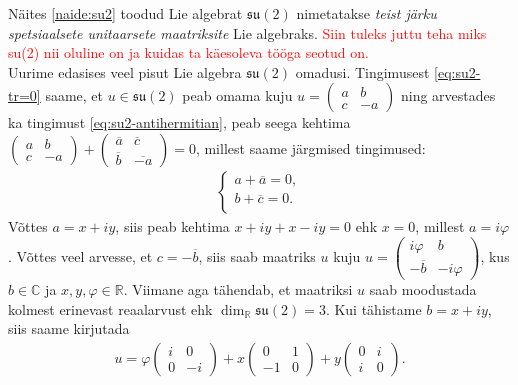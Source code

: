 \documentclass[a4paper,12pt]{article}
\theoremstyle{plain}
\theoremstyle{definition}
\numberwithin{equation}{section}
\begin{document}
Näites \ref{naide:su2} toodud Lie algebrat $\mathfrak{su}\left(2\right)$ nimetatakse \emph{teist järku spetsiaalsete unitaarsete maatriksite} Lie algebraks. \textcolor{red}{Siin tuleks juttu teha miks su(2) nii oluline on ja kuidas ta käesoleva tööga seotud on.} \\
Uurime edasises veel pisut Lie algebra $\mathfrak{su}\left(2\right)$ omadusi. Tingimusest \ref{eq:su2-tr=0} saame, et $u \in \mathfrak{su}\left(2\right)$ peab omama kuju $u = \begin{pmatrix} a & b \\ c & -a\end{pmatrix}$ ning arvestades ka tingimust \ref{eq:su2-antihermitian}, peab seega kehtima $\begin{pmatrix} a & b \\ c & -a\end{pmatrix} + \begin{pmatrix} \overline{a} & \overline{c} \\ \overline{b} & \overline{-a} \end{pmatrix} = 0$, millest saame järgmised tingimused:
\begin{align*}
\begin{cases}
    a + \overline{a} = 0, \\
    b + \overline{c} = 0. \\
  \end{cases}
\end{align*}
Võttes $a = x + iy$, siis peab kehtima $x + iy + x - iy = 0$ ehk $x = 0$, millest $a = i\varphi$. Võttes veel arvesse, et $c = -\overline{b}$, siis saab maatriks $u$ kuju $u = \begin{pmatrix} i\varphi & b \\ -\overline{b} & -i\varphi \end{pmatrix}$, kus $b \in \mathbb{C}$ ja $x, y, \varphi \in \mathbb{R}$. Viimane aga tähendab, et maatriksi $u$ saab moodustada kolmest erinevast reaalarvust ehk $\dim_{\mathbb{R}} \mathfrak{su}\left(2\right) = 3$. Kui tähistame $b = x + iy$, siis saame kirjutada
\begin{align*}
u = \varphi \begin{pmatrix} i & 0 \\ 0 & -i \end{pmatrix} + x \begin{pmatrix} 0 & 1 \\ -1 & 0 \end{pmatrix} + y \begin{pmatrix} 0 & i \\ i & 0 \end{pmatrix}.
\end{align*}
\end{document}
